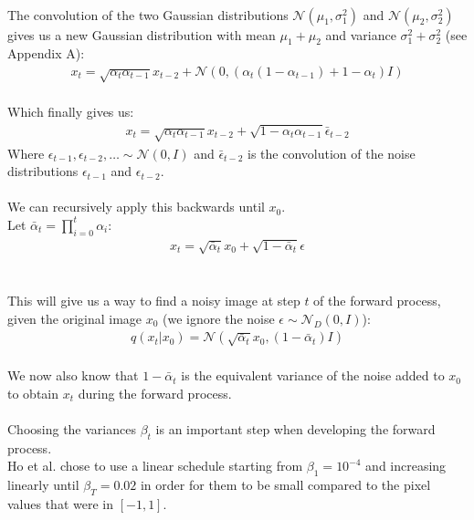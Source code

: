 \documentclass{article}
\begin{document}
\\
The convolution of the two Gaussian distributions $\mathcal{N}(\mu_1, \sigma_1^2)$ and $\mathcal{N}(\mu_2, \sigma_2^2)$ gives us a new Gaussian distribution with mean $\mu_1 + \mu_2$ and variance $\sigma_1^2 + \sigma_2^2$ (see Appendix A):
\begin{align}
  x_t = \sqrt{\alpha_t \alpha_{t-1}} x_{t-2} + \mathcal{N}\left(0, \left(\alpha_t\left(1 - \alpha_{t-1}\right) + 1 - \alpha_t\right)I\right)
\end{align}
\\
Which finally gives us:
\begin{gather*}
  x_t = \sqrt{\alpha_t \alpha_{t-1}} x_{t-2} + \sqrt{1 - \alpha_t \alpha_{t-1}} \bar{\epsilon}_{t - 2}
\end{gather*}
Where $\epsilon_{t - 1}, \epsilon_{t - 2}, \ldots \sim \mathcal{N}\left(0, I\right)$ and $\bar{\epsilon}_{t - 2}$ is the convolution of the noise distributions $\epsilon_{t - 1}$ and $\epsilon_{t - 2}$.
\\\\
We can recursively apply this backwards until $x_0$. \\
Let $\bar{\alpha}_t = \prod_{i=0}^{t}{\alpha_i}$:
\begin{gather}
  x_t = \sqrt{\bar{\alpha}_t} x_0 + \sqrt{1 - \bar{\alpha}_t} \epsilon
\end{gather}
\\\\
This will give us a way to find a noisy image at step $t$ of the forward process, given the original image $x_0$ (we ignore the noise $\epsilon \sim \mathcal{N}_D\left(0, I\right)$):
\begin{gather}
  q\left(x_t | x_0\right) = \mathcal{N}\left(\sqrt{\bar{\alpha}_t} x_0, \left(1 - \bar{\alpha}_t\right)I\right)
\end{gather}
\\
We now also know that $1 - \bar{\alpha}_t$ is the equivalent variance of the noise added to $x_0$ to obtain $x_t$ during the forward process. \cite{nichol2021improved}
\\\\
Choosing the variances $\beta_t$ is an important step when developing the forward process. \\
Ho et al. \cite{ho2020denoising} chose to use a linear schedule starting from $\beta_1 = 10^{-4}$ and increasing linearly until $\beta_T = 0.02$ in order for them to be small compared to the pixel values that were in $\left[-1, 1\right]$. \cite{ho2020denoising} \\
\end{document}
